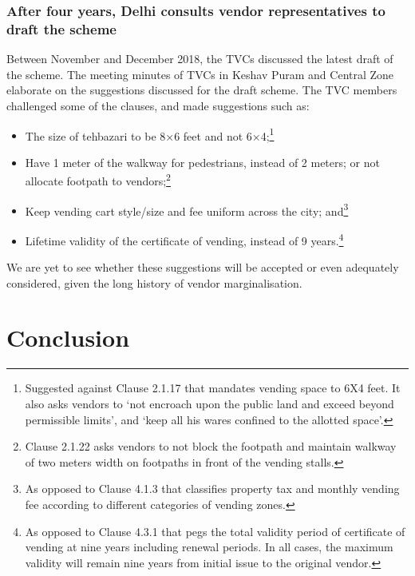 \documentclass[a4paper, 12pt, twoside, table]{article}
\begin{document}
{{\subsubsection*{After four years, Delhi consults vendor representatives to draft the scheme}

Between November and December 2018, the TVCs discussed the latest draft of the scheme. The meeting minutes of TVCs in Keshav Puram and Central Zone elaborate on the suggestions discussed for the draft scheme. The TVC members challenged some of the clauses, and made suggestions such as: 
\begin{itemize}

\item The size of tehbazari to be 8×6 feet and not 6×4;\footnote{Suggested against Clause 2.1.17 that mandates vending space to 6X4 feet. It also asks vendors to `not encroach upon the public land and exceed beyond permissible limits', and `keep all his wares confined to the allotted space'. 
}
\item Have 1 meter of the walkway for pedestrians, instead of 2 meters; or not allocate footpath to vendors;\footnote{ Clause 2.1.22 asks vendors to not block the footpath and maintain walkway of two meters width on footpaths in front of the vending stalls.
}
\item Keep vending cart style/size and fee uniform across the city; and\footnote{ As opposed to Clause 4.1.3 that classifies property tax and monthly vending fee according to different categories of vending zones.
}
\item Lifetime validity of the certificate of vending, instead of 9 years.\footnote{ As opposed to Clause 4.3.1 that pegs the total validity period of certificate of vending at nine years including renewal periods. In all cases, the maximum validity will remain nine years from initial issue to the original vendor. 
}
\end{itemize}
We are yet to see whether these suggestions will be accepted or even adequately considered, given the long history of vendor marginalisation.


\section*{Conclusion}

}}
\end{document}
